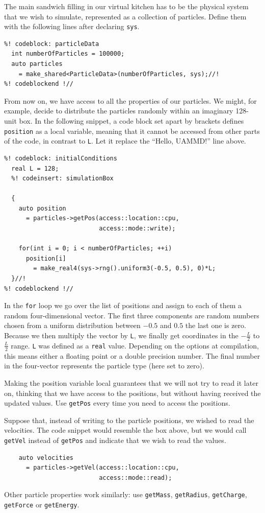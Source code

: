 The main sandwich filling in our virtual kitchen has to be the physical system
that we wish to simulate, represented as a collection of particles. Define them
with the following lines after declaring \texttt{sys}.
\begin{lstlisting}
%! codeblock: particleData
  int numberOfParticles = 100000;
  auto particles
    = make_shared<ParticleData>(numberOfParticles, sys);//!
%! codeblockend !//
\end{lstlisting}
From now on, we have access to all the properties of our particles. We might, 
for example, decide to distribute the particles randomly within an imaginary 
128-unit box. In the following snippet, a code block set apart by brackets
defines \texttt{position} as a local variable, meaning that it cannot be
accessed from  other parts of the code, in contrast to \texttt{L}. Let it
replace the ``Hello, UAMMD!'' line above.\label{initialConditions}
\begin{lstlisting}
%! codeblock: initialConditions
  real L = 128;
  %! codeinsert: simulationBox

  {
    auto position
      = particles->getPos(access::location::cpu,
                          access::mode::write);

    for(int i = 0; i < numberOfParticles; ++i)
      position[i]
        = make_real4(sys->rng().uniform3(-0.5, 0.5), 0)*L;
  }//!
%! codeblockend !//
\end{lstlisting}
In the \texttt{for} loop we go over the list of positions and assign to each of
them a random four-dimensional vector. The first three components are random
numbers chosen from a uniform distribution between $-0.5$ and $0.5$ the last one
is zero. Because we then multiply the vector by \texttt{L}, we finally get
coordinates in the $-\frac{L}{2}$ to $\frac{L}{2}$ range. \texttt{L} was defined
as a \texttt{real} value. Depending on the options at compilation, this means
either a floating point or a double precision number. The final number in the
four-vector represents the particle type (here set to zero).

Making the position variable local guarantees that we will not try to read it
later on, thinking that we have access to the positions, but without having
received the updated values. Use \texttt{getPos} every time you need to access
the positions.

Suppose that, instead of writing to the particle positions, we wished to read
the velocities. The code snippet would resemble the box above, but we would call
\texttt{getVel} instead of \texttt{getPos} and indicate that we wish to read the
values.
\begin{lstlisting}
    auto velocities
      = particles->getVel(access::location::cpu,
                          access::mode::read);
\end{lstlisting}
Other particle properties work similarly: use \texttt{getMass},
\texttt{getRadius}, \texttt{getCharge}, \texttt{getForce} or \texttt{getEnergy}.

